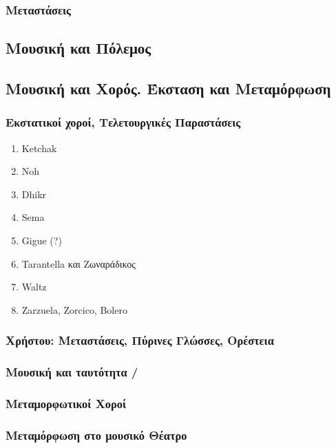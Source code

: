 \subsubsection{Μεταστάσεις}
\label{sec:orgcd64d6d}
\subsection{Μουσική και Πόλεμος}
\label{sec:orgafb8454}
\subsection{Μουσική και Χορός. Έκσταση και Μεταμόρφωση}
\label{sec:org6967fef}
\subsubsection{Εκστατικοί χοροί, Τελετουργικές Παραστάσεις}
\label{sec:org7084a76}
\begin{enumerate}
\item Ketchak
\label{sec:org86a553f}
\item Noh
\label{sec:orgb6c2b0c}
\item Dhikr
\label{sec:org9101f5e}
\item Sema
\label{sec:org25396b9}
\item Gigue (?)
\label{sec:org092fdc7}
\item Tarantella και Ζωναράδικος
\label{sec:orgc0884f3}
\item Waltz
\label{sec:org387ee6d}
\item Zarzuela, Zorcico, Bolero
\label{sec:org9b14812}
\end{enumerate}
\subsubsection{Χρήστου: Μεταστάσεις, Πύρινες Γλώσσες, Ορέστεια}
\label{sec:orgda1e9cc}
\subsubsection{Μουσική και ταυτότητα /}
\label{sec:org5feb74b}
\subsubsection{Μεταμορφωτικοί Χοροί}
\label{sec:orgf69106f}
\subsubsection{Μεταμόρφωση στο μουσικό Θέατρο}
\label{sec:org5c8c474}

